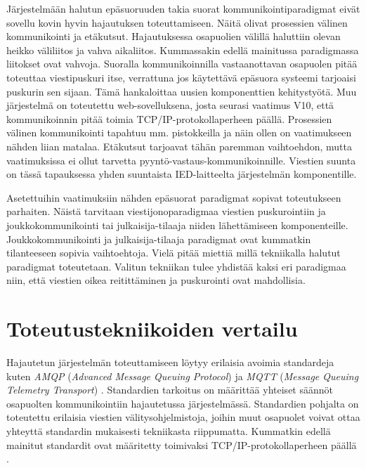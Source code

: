 Järjestelmään halutun epäsuoruuden takia suorat kommunikointiparadigmat eivät sovellu kovin hyvin hajautuksen toteuttamiseen. Näitä olivat prosessien välinen kommunikointi ja etäkutsut. Hajautuksessa osapuolien välillä haluttiin olevan heikko väliliitos ja vahva aikaliitos. Kummassakin edellä mainitussa paradigmassa liitokset ovat vahvoja. Suoralla kommunikoinnilla vastaanottavan osapuolen pitää toteuttaa viestipuskuri itse, verrattuna jos käytettävä epäsuora systeemi tarjoaisi puskurin sen sijaan. Tämä hankaloittaa uusien komponenttien kehitystyötä. Muu järjestelmä on toteutettu web-sovelluksena, josta seurasi vaatimus V10, että kommunikoinnin pitää toimia TCP/IP-protokollaperheen päällä. Prosessien välinen kommunikointi tapahtuu mm. pistokkeilla ja näin ollen on vaatimukseen nähden liian matalaa. Etäkutsut tarjoavat tähän paremman vaihtoehdon, mutta vaatimuksissa ei ollut tarvetta pyyntö-vastaus-kommunikoinnille. Viestien suunta on tässä tapauksessa yhden suuntaista IED-laitteelta järjestelmän komponentille.

Asetettuihin vaatimuksiin nähden epäsuorat paradigmat sopivat toteutukseen parhaiten. Näistä tarvitaan viestijonoparadigmaa viestien puskurointiin ja joukkokommunikointi tai julkaisija-tilaaja niiden lähettämiseen komponenteille. Joukkokommunikointi ja julkaisija-tilaaja paradigmat ovat kummatkin tilanteeseen sopivia vaihtoehtoja. Vielä pitää miettiä millä tekniikalla halutut paradigmat toteutetaan. Valitun tekniikan tulee yhdistää kaksi eri paradigmaa niin, että viestien oikea reitittäminen ja puskurointi ovat mahdollisia.



\section{Toteutustekniikoiden vertailu}
Hajautetun järjestelmän toteuttamiseen löytyy erilaisia avoimia standardeja kuten \emph{AMQP} (\emph{Advanced Message Queuing Protocol}) \cite{amqp-homepage} ja \emph{MQTT} (\emph{Message Queuing Telemetry Transport}) \cite{mqtt-homepage}. Standardien tarkoitus on määrittää yhteiset säännöt osapuolten kommunikointiin hajautetussa järjestelmässä. Standardien pohjalta on toteutettu erilaisia viestien välitysohjelmistoja, joihin muut osapuolet voivat ottaa yhteyttä standardin mukaisesti tekniikasta riippumatta. Kummatkin edellä mainitut standardit ovat määritetty toimivaksi TCP/IP-protokollaperheen päällä \cite[s.~1]{mqtt-specification} \cite[s.~22]{AMQP-specification}.

